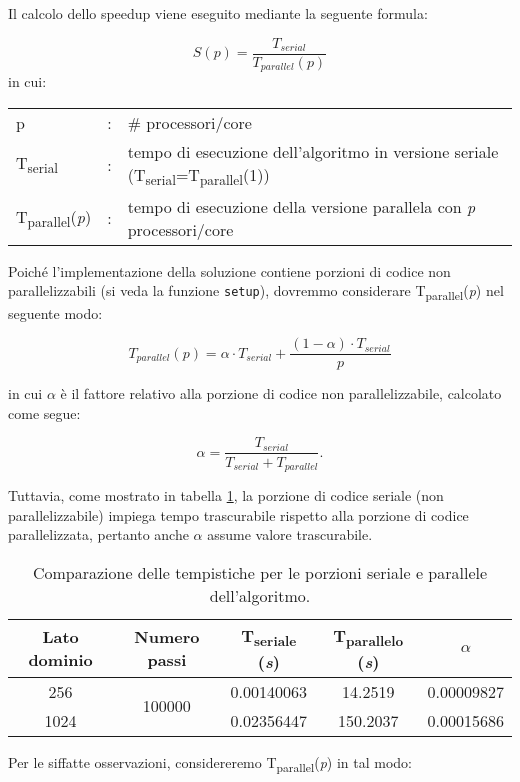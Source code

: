 Il calcolo dello speedup viene eseguito mediante la seguente formula:

\[
    S(p) = \frac{T_{serial}}{T_{parallel}(p)}
\]
in cui:
\begin{table}[ht]
\begin{tabular}{lll}
    p & : & \# processori/core\\
    T\textsubscript{serial}& : & tempo di esecuzione dell'algoritmo in versione
    seriale
    (T\textsubscript{serial}=T\textsubscript{parallel}(1))\\
    T\textsubscript{parallel}(\textit{p}) & : & tempo di esecuzione della
    versione parallela con \textit{p} processori/core
\end{tabular}
\end{table}

Poiché l'implementazione della soluzione contiene porzioni di codice non
parallelizzabili (si veda la funzione \texttt{setup}), dovremmo considerare
T\textsubscript{parallel}(\textit{p}) nel seguente modo:

\[ 
T_{parallel}(p) = \alpha \cdot T_{serial} +  \frac{(1 - \alpha) \cdot
T_{serial}}{p}
\]

in cui $\alpha$ è il fattore relativo alla porzione di codice non
parallelizzabile, calcolato come segue:

\[ 
\alpha = \frac{T_{serial}}{T_{serial} + T_{parallel}}.
\]

Tuttavia, come mostrato in tabella \ref{tab:alpha}, la porzione di codice
seriale (non parallelizzabile) impiega tempo trascurabile rispetto alla porzione
di codice parallelizzata, pertanto anche $\alpha$ assume valore trascurabile.

\begin{table}[ht]
\centering
\begin{tabular}{ccccc}
\toprule
 Lato dominio & Numero passi & T\textsubscript{seriale} (\textit{s}) &
 T\textsubscript{parallelo} (\textit{s})& $\alpha$ \\
 \midrule
    256 & \multirow{2}{*}{100000} & 0.00140063 & 14.2519 & 0.00009827 \\
    1024 & & 0.02356447 & 150.2037 & 0.00015686 \\
\bottomrule
\end{tabular}
\caption{Comparazione delle tempistiche per le porzioni seriale e parallele
dell'algoritmo.\label{tab:alpha}}
\end{table}

Per le siffatte osservazioni, considereremo
T\textsubscript{parallel}(\textit{p}) in tal modo:

